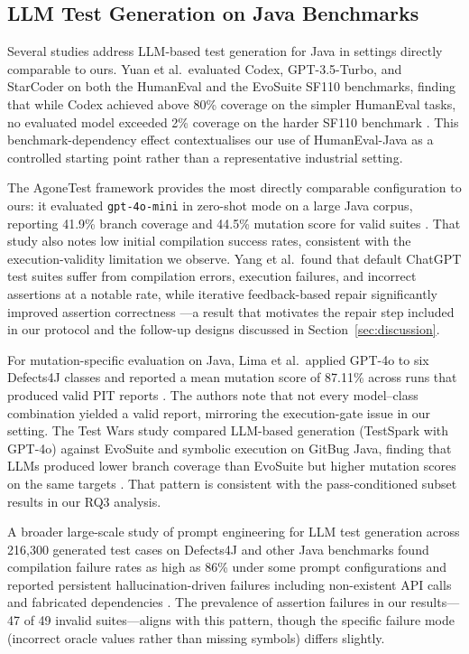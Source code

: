 ﻿\documentclass[conference]{IEEEtran}
\begin{document}
\subsection{LLM Test Generation on Java Benchmarks}

Several studies address LLM-based test generation for Java in settings directly comparable to ours. Yuan et al.\ evaluated Codex, GPT-3.5-Turbo, and StarCoder on both the HumanEval and the EvoSuite SF110 benchmarks, finding that while Codex achieved above 80\% coverage on the simpler HumanEval tasks, no evaluated model exceeded 2\% coverage on the harder SF110 benchmark \cite{yuan2024junit}. This benchmark-dependency effect contextualises our use of HumanEval-Java as a controlled starting point rather than a representative industrial setting.

The AgoneTest framework provides the most directly comparable configuration to ours: it evaluated \texttt{gpt-4o-mini} in zero-shot mode on a large Java corpus, reporting 41.9\% branch coverage and 44.5\% mutation score for valid suites \cite{schafer2025agonetest}. That study also notes low initial compilation success rates, consistent with the execution-validity limitation we observe. Yang et al.\ found that default ChatGPT test suites suffer from compilation errors, execution failures, and incorrect assertions at a notable rate, while iterative feedback-based repair significantly improved assertion correctness \cite{yang2024chatgpt}---a result that motivates the repair step included in our protocol and the follow-up designs discussed in Section~\ref{sec:discussion}.

For mutation-specific evaluation on Java, Lima et al.\ applied GPT-4o to six Defects4J classes and reported a mean mutation score of 87.11\% across runs that produced valid PIT reports \cite{lima2025mutation}. The authors note that not every model--class combination yielded a valid report, mirroring the execution-gate issue in our setting. The Test Wars study compared LLM-based generation (TestSpark with GPT-4o) against EvoSuite and symbolic execution on GitBug Java, finding that LLMs produced lower branch coverage than EvoSuite but higher mutation scores on the same targets \cite{alkhateeb2025testwars}. That pattern is consistent with the pass-conditioned subset results in our RQ3 analysis.

A broader large-scale study of prompt engineering for LLM test generation across 216,300 generated test cases on Defects4J and other Java benchmarks found compilation failure rates as high as 86\% under some prompt configurations and reported persistent hallucination-driven failures including non-existent API calls and fabricated dependencies \cite{nie2026prompt}. The prevalence of assertion failures in our results---47 of 49 invalid suites---aligns with this pattern, though the specific failure mode (incorrect oracle values rather than missing symbols) differs slightly.
\end{document}
